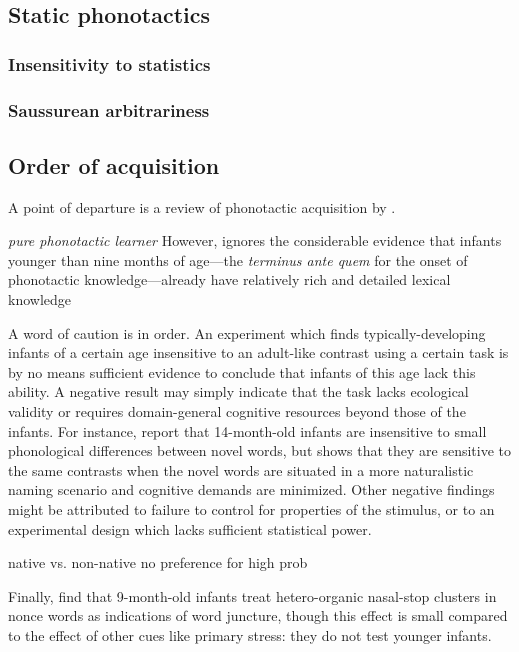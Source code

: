\subsection{Static phonotactics}
\subsubsection{Insensitivity to statistics}
\subsubsection{Saussurean arbitrariness}

\subsection{Order of acquisition}

A point of departure is a review of phonotactic acquisition by \citet{Hayes2004b}.

\emph{pure phonotactic learner}
However, \citeauthor{Hayes2004b} ignores the considerable evidence that infants younger than nine months of age---the \emph{terminus ante quem} for the onset of phonotactic knowledge---already have relatively rich and detailed lexical knowledge

A word of caution is in order. An experiment which finds typically-developing infants of a certain age insensitive to an adult-like contrast using a certain task is by no means sufficient evidence to conclude that infants of this age lack this ability. A negative result may simply indicate that the task lacks ecological validity or requires domain-general cognitive resources beyond those of the infants. For instance, \citet{Werker2002} report that 14-month-old infants are insensitive to small phonological differences between novel words, but \citet{Fennell2006} shows that they are sensitive to the same contrasts when the novel words are situated in a more naturalistic naming scenario and cognitive demands are minimized. Other negative findings might be attributed to failure to control for properties of the stimulus, or to an experimental design which lacks sufficient statistical power.

\citet{Jusczyk1993b} native vs. non-native
\citet{Jusczyk1994} no preference for high prob
\citet{Friederici1993}

Finally, \citet{Mattys1999} find that 9-month-old infants treat hetero-organic nasal-stop clusters in nonce words as indications of word juncture, though this effect is small compared to the effect of other cues like primary stress: they do not test younger infants.

